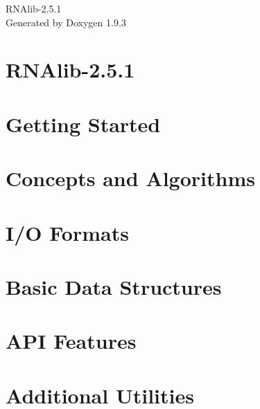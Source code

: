 \documentclass[twoside]{book}
\newcommand{\+}{\discretionary{\mbox{\scriptsize$\hookleftarrow$}}{}{}}
\newcommand{\clearemptydoublepage}{%
    \newpage{\pagestyle{empty}\cleardoublepage}%
  }
\begin{document}
  \raggedbottom
    \hypersetup{pageanchor=false,
                bookmarksnumbered=true,
                pdfencoding=unicode
               }
  \begin{titlepage}
  \vspace*{7cm}
  \begin{center}%
  {\Large RNAlib-\/2.\+5.\+1}\\
  \vspace*{1cm}
  {\large Generated by Doxygen 1.9.3}\\
  \end{center}
  \end{titlepage}
  \clearemptydoublepage
  \tableofcontents
  \clearemptydoublepage
  \hypersetup{pageanchor=true}
\chapter{RNAlib-\/2.5.1}
\label{index}\hypertarget{index}{}
\chapter{Getting Started}
\label{getting_started}

\chapter{Concepts and Algorithms}
\label{concepts}

\chapter{I/O Formats}
\label{io}

\chapter{Basic Data Structures}
\label{data_structures}

\chapter{API Features}
\label{api_features}

\chapter{Additional Utilities}
\label{utilities}

\end{document}
